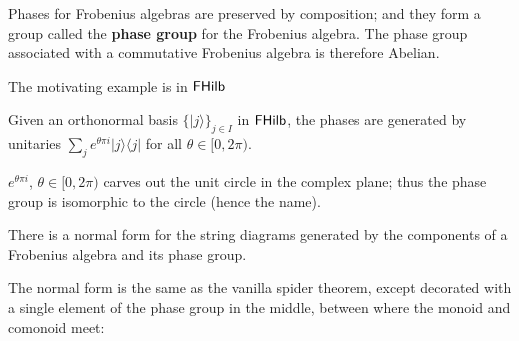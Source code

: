 \begin{definition}
Phases for Frobenius algebras are preserved by composition; and they form a group called the {\bf phase group} for the Frobenius algebra.  The phase group associated with a commutative Frobenius algebra is therefore Abelian.
\end{definition}

The motivating example is in $\mathsf{FHilb}$
\begin{example}
Given an orthonormal basis $\{| j \rangle \}_{j \in I}$ in $\mathsf{FHilb}$, the phases are generated by unitaries $\sum_{j} e^{ \theta \pi i}|  j \rangle\langle j|$ for all $\theta \in [0, 2\pi)$. 

 $e^{ \theta \pi i}$, $\theta \in [0, 2\pi)$ carves out the unit circle in the complex plane; thus the phase group is isomorphic to the circle (hence the name).
\end{example}

\begin{lemma}
There is a normal form for the string diagrams generated by the components of a Frobenius algebra and its phase group.
\end{lemma}

The normal form is the same as the vanilla spider theorem, except decorated with a single element of the phase group in the middle, between where the monoid and comonoid meet:

